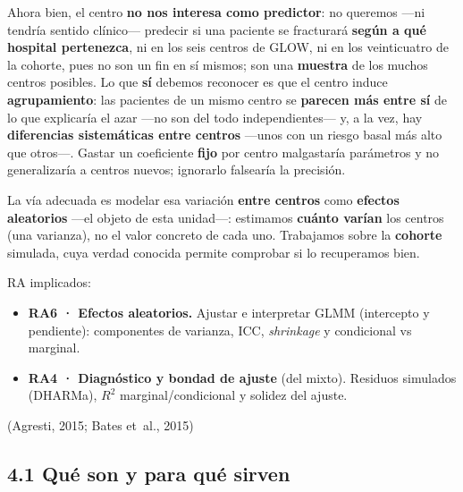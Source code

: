 \documentclass[
  letterpaper,
  DIV=11,
  numbers=noendperiod]{scrartcl}
\providecommand{\tightlist}{%
  \setlength{\itemsep}{0pt}\setlength{\parskip}{0pt}}\usepackage{longtable,booktabs,array}
\begin{document}
Ahora bien, el centro \textbf{no nos interesa como predictor}: no
queremos ---ni tendría sentido clínico--- predecir si una paciente se
fracturará \textbf{según a qué hospital pertenezca}, ni en los seis
centros de GLOW, ni en los veinticuatro de la cohorte, pues no son un
fin en sí mismos; son una \textbf{muestra} de los muchos centros
posibles. Lo que \textbf{sí} debemos reconocer es que el centro induce
\textbf{agrupamiento}: las pacientes de un mismo centro se
\textbf{parecen más entre sí} de lo que explicaría el azar ---no son del
todo independientes--- y, a la vez, hay \textbf{diferencias sistemáticas
entre centros} ---unos con un riesgo basal más alto que otros---. Gastar
un coeficiente \textbf{fijo} por centro malgastaría parámetros y no
generalizaría a centros nuevos; ignorarlo falsearía la precisión.

La vía adecuada es modelar esa variación \textbf{entre centros} como
\textbf{efectos aleatorios} ---el objeto de esta unidad---: estimamos
\textbf{cuánto varían} los centros (una varianza), no el valor concreto
de cada uno. Trabajamos sobre la \textbf{cohorte} simulada, cuya verdad
conocida permite comprobar si lo recuperamos bien.

\begin{tcolorbox}[enhanced jigsaw, breakable, colframe=quarto-callout-note-color-frame, left=2mm, arc=.35mm, colbacktitle=quarto-callout-note-color!10!white, toprule=.15mm, colback=white, coltitle=black, rightrule=.15mm, opacitybacktitle=0.6, title=\textcolor{quarto-callout-note-color}{\faInfo}\hspace{0.5em}{Sobre esta unidad}, titlerule=0mm, toptitle=1mm, bottomtitle=1mm, leftrule=.75mm, bottomrule=.15mm, opacityback=0]

RA implicados:

\begin{itemize}
\tightlist
\item
  \textbf{RA6 · Efectos aleatorios.} Ajustar e interpretar GLMM
  (intercepto y pendiente): componentes de varianza, ICC,
  \emph{shrinkage} y condicional vs marginal.
\item
  \textbf{RA4 · Diagnóstico y bondad de ajuste} (del mixto). Residuos
  simulados (DHARMa), \(R^2\) marginal/condicional y solidez del ajuste.
\end{itemize}

(Agresti, 2015; Bates et~al., 2015)

\end{tcolorbox}

\hypertarget{sec-u14-que-son}{%
\subsection{4.1 Qué son y para qué sirven}\label{sec-u14-que-son}}
\end{document}

